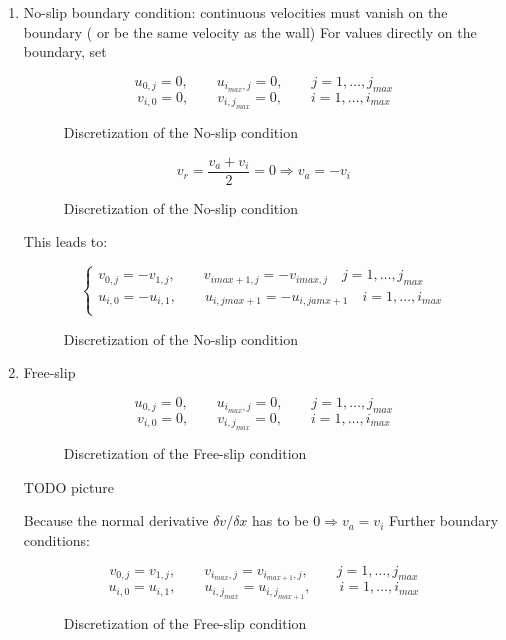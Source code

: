 \begin{enumerate}
	\item No-slip boundary condition: continuous velocities must vanish on the boundary ( or be the same velocity as the wall)
For values directly on the boundary, set
\begin{figure}[H]
	\centering
	\[ u_{0,j} = 0, \qquad u_{i_{max},j} = 0, \qquad j = 1,\dots,j_{max} \]
	\[ v_{i,0} = 0, \qquad v_{i,j_{max}} = 0, \qquad i = 1,\dots,i_{max} \]
	\renewcommand{\thefigure}{3.21}
	\caption{Discretization of the No-slip condition}
	\label{fig:disc-nosplipa}
\end{figure}

\begin{figure}[H]
	\centering
	\[ v_r = \frac{v_a + v_i}{2} = 0 \Rightarrow v_a = -v_i\]
	\renewcommand{\thefigure}{3.22}
	\caption{Discretization of the No-slip condition}
	\label{fig:disc-nosplipb}
\end{figure}

This leads to: %
\begin{figure}[H]
	\centering
   \[\begin{cases}
         v_{0,j} = -v_{1,j}, \qquad v_{imax+1,j} = -v_{imax,j} \quad j = 1,\dots, j_{max} \\
         u_{i,0} = -u_{i,1}, \qquad u_{i,jmax+1} = -u_{i,jamx+1} \quad i = 1,\dots, i_{max}\\
      \end{cases}
   \]
	\renewcommand{\thefigure}{3.23}
	\caption{Discretization of the No-slip condition}
	\label{fig:disc-nosplipc}
\end{figure}

	\item Free-slip
\begin{figure}[H]
	\centering
	\[ u_{0,j} = 0, \qquad u_{i_{max},j} = 0, \qquad j = 1,\dots,j_{max} \]
	\[ v_{i,0} = 0, \qquad v_{i,j_{max}} = 0, \qquad i = 1,\dots,i_{max} \]
	\renewcommand{\thefigure}{3.24}
	\caption{Discretization of the Free-slip condition}
	\label{fig:disc-freesplipa}
\end{figure}

TODO picture

Because the normal derivative $\delta v/ \delta x$ has to be $0 \Rightarrow v_a = v_i$ Further boundary conditions:
\begin{figure}[H]
	\centering
	\[ v_{0,j} = v_{1,j}, \qquad v_{i_{max},j} = v_{i_{max+1}, j}, \qquad j = 1,\dots,j_{max} \]
	\[ u_{i,0} = u_{i,1}, \qquad u_{i,j_{max}} = u_{i,j_{max+1}}, \qquad i = 1,\dots,i_{max} \]
	\renewcommand{\thefigure}{3.25}
	\caption{Discretization of the Free-slip condition}
	\label{fig:disc-freesplipb}
\end{figure}
	

\end{enumerate}
